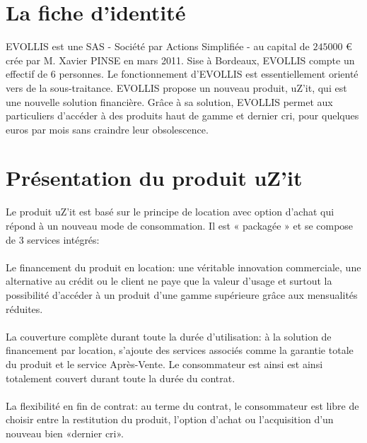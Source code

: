 \section{La fiche d'identité}

\textsf{EVOLLIS} est une \textsf{SAS} - Société par Actions Simplifiée - au capital 
de $245 000$ € crée par \textsf{M. Xavier PINSE} en mars 2011. Sise à Bordeaux, 
\textsf{EVOLLIS} compte un effectif de $6$ personnes. Le fonctionnement 
d'\textsf{EVOLLIS} est essentiellement orienté vers de la sous-traitance. 
\textsf{EVOLLIS} propose un nouveau produit, \textsf{uZ'it}, qui est une 
nouvelle solution financière. Grâce à sa solution, \textsf{EVOLLIS} permet 
aux particuliers d'accéder à des produits haut de gamme et dernier cri,
pour quelques euros par mois sans craindre leur obsolescence.

\section{Présentation du produit \textsf{uZ'it}}

Le produit \textsf{uZ'it} est basé sur le principe de location avec option d'achat qui répond à 
un nouveau mode de consommation. Il est « packagée » et se compose de 3 services intégrés:
\\\\
\textsf{Le financement du produit en location}: une véritable innovation commerciale,
une alternative au crédit ou le client ne paye que la valeur d'usage et surtout la 
possibilité d'accéder à un produit d'une gamme supérieure grâce aux mensualités réduites.
\\\\
\textsf{La couverture complète durant toute la durée d'utilisation}: à la solution de 
financement par location, s'ajoute des services associés comme la garantie totale du
produit et le service Après-Vente. Le consommateur est ainsi est ainsi totalement
couvert durant toute la durée du contrat. 
\\\\
\textsf{La flexibilité en fin de contrat}: au terme du contrat, le consommateur est 
libre de choisir entre la restitution du produit, l'option d'achat ou l'acquisition
d'un nouveau bien «dernier cri».

